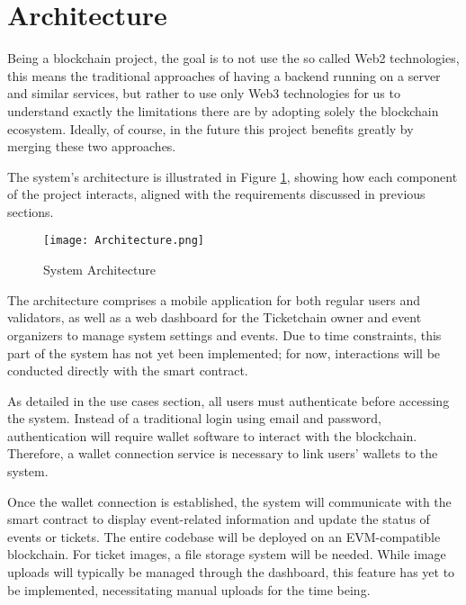 \section{Architecture}
\label{sec:architecture}

Being a blockchain project, the goal is to not use the so called Web2
technologies, this means the traditional approaches of having a backend running
on a server and similar services, but rather to use only Web3 technologies for
us to understand exactly the limitations there are by adopting solely the
blockchain ecosystem. Ideally, of course, in the future this project benefits
greatly by merging these two approaches.

The system's architecture is illustrated in Figure \ref{fig:architecture},
showing how each component of the project interacts, aligned with the
requirements discussed in previous sections.

\begin{figure}[H]
    \centering
    \texttt{[image: Architecture.png]}
    \caption{System Architecture}
    \label{fig:architecture}
\end{figure}

The architecture comprises a mobile application for both regular users and
validators, as well as a web dashboard for the Ticketchain owner and event
organizers to manage system settings and events. Due to time constraints, this
part of the system has not yet been implemented; for now, interactions will be
conducted directly with the smart contract.

As detailed in the use cases section, all users must authenticate before
accessing the system. Instead of a traditional login using email and password,
authentication will require wallet software to interact with the blockchain.
Therefore, a wallet connection service is necessary to link users' wallets to
the system.

Once the wallet connection is established, the system will communicate with the
smart contract to display event-related information and update the status of
events or tickets. The entire codebase will be deployed on an EVM-compatible
blockchain. For ticket images, a file storage system will be needed. While
image uploads will typically be managed through the dashboard, this feature has
yet to be implemented, necessitating manual uploads for the time being.
